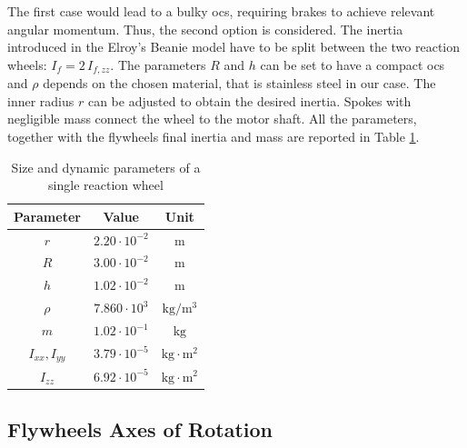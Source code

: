 \documentclass[journal,letterpaper]{IEEEtran}
\begin{document}
The first case would lead to a bulky \acrshort{ocs}, requiring brakes to achieve relevant angular momentum. Thus, the second option is considered. The inertia introduced in the Elroy's Beanie model have to be split between the two reaction wheels: $I_f = 2 \, I_{f, zz}$.
The parameters $R$ and $h$ can be set to have a compact \acrshort{ocs} and $\rho$ depends on the chosen material, that is stainless steel in our case. The inner radius $r$ can be adjusted to obtain the desired inertia. Spokes with negligible mass connect the wheel to the motor shaft. All the parameters, together with the flywheels final inertia and mass are reported in Table \ref{tab:dim_fw}.
\begin{table}
	\centering
	\begin{tabular}{ccc}
		Parameter & Value & Unit \\
		\hline
		\hline
		$r$ & $2.20\cdot 10^{-2}$ & $\mathrm{m}$ \\
		$R$ & $3.00\cdot 10^{-2}$ & $\mathrm{m}$ \\
		$h$   & $1.02\cdot 10^{-2}$ & $\mathrm{m}$ \\
		$\rho$   & $7.860 \cdot 10^{3}$ & $\mathrm{kg/m^3}$ \\
		$m$   & $1.02\cdot 10^{-1}$ & $\mathrm{kg}$ \\
		$I_{xx}, I_{yy}$   & $3.79 \cdot 10^{-5}$ & $\mathrm{kg \cdot m^2}$ \\
		$I_{zz}$   & $6.92 \cdot 10^{-5}$ & $ \mathrm{kg \cdot m^2}$ \\
	\end{tabular}
	\caption{Size and dynamic parameters of a single reaction wheel}
	\label{tab:dim_fw}
\end{table}

\subsection{Flywheels Axes of Rotation}
\end{document}
